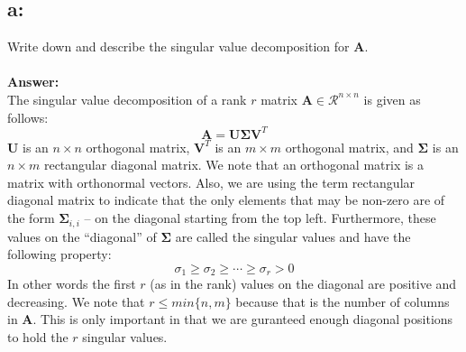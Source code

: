 \documentclass[]{article}
\begin{document}
	\subsection*{a:}
	Write down and describe the singular value decomposition for $\mathbf{A}$.
	\\~\\
	\textbf{Answer:}\\
	The singular value decomposition of a rank $r$ matrix $\mathbf{A}\in\mathcal{R}^{n\times n}$ is given as follows:
	\[\mathbf{A}=\mathbf{U\Sigma V}^T\]
	$\mathbf{U}$ is an $n\times n$ orthogonal matrix, $\mathbf{V}^T$ is an $m\times m$ orthogonal matrix, and $\mathbf{\Sigma}$ is an $n\times m$ rectangular diagonal matrix. We note that an orthogonal matrix is a matrix with orthonormal vectors. Also, we are using the term rectangular diagonal matrix to indicate that the only elements that may be non-zero are of the form $\mathbf{\Sigma}_{i,i}$ -- on the diagonal starting from the top left. Furthermore, these values on the ``diagonal'' of $\mathbf{\Sigma}$ are called the singular values and have the following property:
	\[\sigma_1\geq\sigma_2\geq\cdots\geq\sigma_r>0\]
	In other words the first $r$ (as in the rank) values on the diagonal are positive and decreasing. We note that $r\leq min\{n,m\}$ because that is the number of columns in $\mathbf{A}$. This is only important in that we are guranteed enough diagonal positions to hold the $r$ singular values.
	
\end{document}
